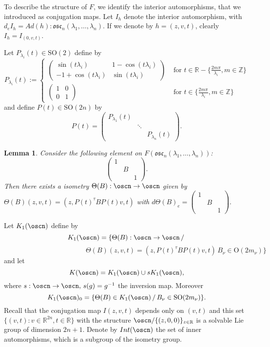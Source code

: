 \documentclass[12pt]{amsart}
\theoremstyle{plain}
\newtheorem{lem}[thm]{Lemma}
\theoremstyle{definition}
\theoremstyle{remark}
\begin{document}
To describe the structure of $F$, we identify the interior automorphisms, that we introduced as conjugation maps. Let $I_h$ denote the interior automorphism, with $d_e I_h=Ad(h): \mathfrak{osc}_n(\lambda_1, \hdots, \lambda_n)$. If we denote by $h=(z,v,t)$, clearly $I_h=I_{(0,v,t)}$.

Let $P_{\lambda_i}(t)\in \mathrm{SO}(2)$ define by
$$P_{\lambda_i}(t):=\left\{
	 \begin{array}{cl}
\left( \begin{matrix}
	\sin(t\lambda_i) & 1 -\cos(t\lambda_i)\\
-1 +\cos(t\lambda_i)  & \sin(t\lambda_i)
\end{matrix}\right) & \mbox{ for } t\in \mathbb R -\{\frac{2m\pi}{\lambda_i}, m\in \mathbb Z\}\\
 \left( \begin{matrix}
1 &0\\
0  & 1
\end{matrix}\right) & \mbox{ for } t\in\{\frac{2m\pi}{\lambda_i}, m\in \mathbb Z\}
\end{array}	
\right.
$$
and define $P(t)\in \mathrm{SO}(2n)$ by
$$P(t)=\left( \begin{matrix}
P_{\lambda_1}(t) & & \\
& \ddots & \\
& & P_{\lambda_n}(t)
\end{matrix}\right).$$

\begin{lem} Consider the following element on $F(\mathfrak{osc}_n(\lambda_1, \hdots, \lambda_n))$:
	$$\left( \begin{matrix}
	1 & & \\
	& B & \\
	& & 1
	\end{matrix}\right).$$
Then there exists a isometry $\Theta(B):\oscn \to \oscn$ given by
$\Theta(B)(z,v,t)=(z, P(t)^{\tau}BP(t)v, t)$ with $d \Theta(B)_e=\left( \begin{matrix}
1 & & \\
& B & \\
& & 1
\end{matrix}\right).$
\end{lem}

Let $K_1(\oscn)$ define by
$$K_1(\oscn)=\{\Theta(B):\oscn \to \oscn \,  /\,$$
$$\qquad \qquad \qquad  \qquad \qquad \qquad \Theta(B)(z,v,t)=(z,P(t)^{\tau}BP(t)v,t)\, B_{\nu}\in\mathrm{O}(2m_{\nu})\}$$
and let $$K(\oscn)=K_1(\oscn)\cup sK_1(\oscn),$$
where $s:\oscn \to \oscn, \, s(g)=g^{-1}$ the inversion map.
Moreover 
$$K_1(\oscn)_0=\{\Theta(B)\in K_1(\oscn)\,/\, B_{\nu}\in \mathrm{SO}(2m_{\nu})\}.$$
Recall that the conjugation map $I{(z,v,t)}$ depends only on $(v,t)$ and this set $\{(v,t): v \in \mathbb R^{2n}, t\in \mathbb R\}$ with the structure $\oscn/\{(z,0,0)\}_{z\in\mathbb R}$ is a solvable Lie group of dimension $2n+1$. Denote by $Int(\oscn)$ the set of inner automorphisms, which is a subgroup of the isometry group. 
\end{document}
